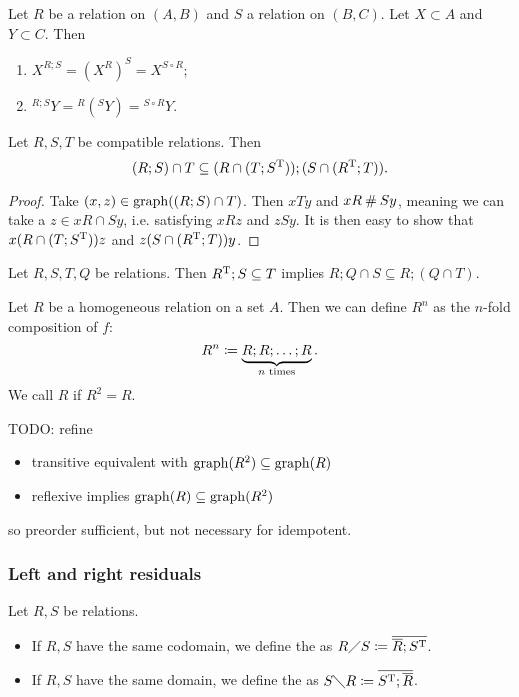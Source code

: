 \begin{lemma}
Let $R$ be a relation on $(A, B)$ and $S$ a relation on $(B, C)$. Let $X\subset A$ and $Y\subset C$. Then
\begin{enumerate}
\item $X^{R;S} = (X^R)^S = X^{S\circ R}$;
\item $^{R;S}Y = {^R({^SY})} = {^{S\circ R}Y}$.
\end{enumerate}
\end{lemma}

\begin{proposition} \label{DedekindFormula}
Let $R,S,T$ be compatible relations. Then
\[ (R;S)\cap T \subseteq (R\cap (T; S^{\mathrm{T}}));(S\cap (R^{\mathrm{T}};T)). \]
\end{proposition}
\begin{proof}
Take $(x,z)\in \operatorname{graph}((R;S)\cap T)$. Then $xTy$ and $xR \mathbin{\#} Sy$, meaning we can take a $z\in xR\cap Sy$, i.e. satisfying $xRz$ and $zSy$. It is then easy to show that $x(R\cap (T; S^{\mathrm{T}}))z$ and $z(S\cap (R^{\mathrm{T}};T))y$.
\end{proof}

\begin{lemma}
Let $R,S,T, Q$ be relations. Then $R^{\mathrm{T}}; S \subseteq T$ implies $R;Q\cap S \subseteq R; (Q\cap T)$.
\end{lemma}

\begin{definition}
Let $R$ be a homogeneous relation on a set $A$. Then we can define $R^n$ as the $n$-fold composition of $f$:
\[ R^n \coloneqq \underbrace{R;R; \ldots ;R}_{\text{$n$ times}}. \]
We call $R$  if $R^2 = R$.
\end{definition}

TODO: refine
\begin{proposition}
\begin{itemize}
\item transitive equivalent with $\operatorname{graph}(R^2) \subseteq \operatorname{graph}(R)$
\item reflexive implies $\operatorname{graph}(R) \subseteq \operatorname{graph}(R^2)$
\end{itemize}
\end{proposition}
so preorder sufficient, but not necessary for idempotent.

\subsubsection{Left and right residuals}
\begin{definition}
Let $R,S$ be relations.
\begin{itemize}
\item If $R,S$ have the same codomain, we define the  as $R\diagup S \coloneqq \overline{\overline{R}; S^{\mathrm{T}}}$.
\item If $R,S$ have the same domain, we define the  as $S\diagdown R \coloneqq \overline{S^{\mathrm{T}}; \overline{R}}$.
\end{itemize}
\end{definition}

